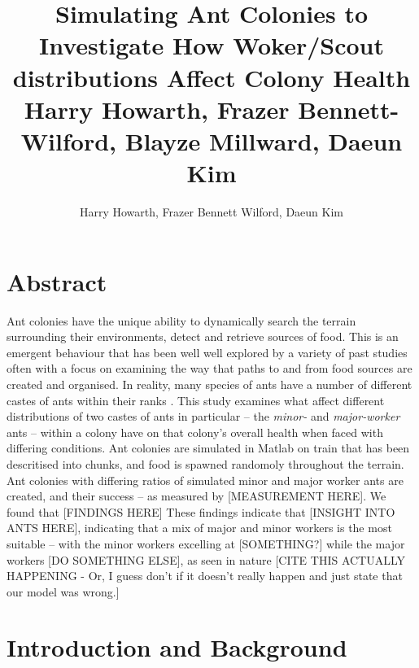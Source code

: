 \documentclass{article}
\title{
  Simulating Ant Colonies to Investigate How Woker/Scout distributions Affect Colony Health
  \small Harry Howarth, Frazer Bennett-Wilford, Blayze Millward, Daeun Kim \\
}
\author{Harry Howarth, Frazer Bennett Wilford, Daeun Kim}
\begin{document}
  
  \section*{Abstract}
    Ant colonies have the unique ability to dynamically search the terrain surrounding their environments, detect and retrieve sources of food. This is an emergent behaviour that
    has been well well explored by a variety of past studies \cite{camazine_self-organization_2003} %
    often with a focus on examining the way that paths to and from food sources are created and organised. %
    In reality, many species of ants have a number of different castes of ants within their ranks \cite{noauthor_caste_nodate}. This study examines what affect different distributions
    of two castes of ants in particular -- the \textit{minor-} and \textit{major-worker} ants -- within a colony have on that colony's overall health when faced with differing conditions.
    Ant colonies are simulated in Matlab on train that has been descritised into chunks, and food is spawned randomoly throughout the terrain. Ant colonies with differing ratios of simulated
    minor and major worker ants are created, and their success -- as measured by [MEASUREMENT HERE].%
    We found that [FINDINGS HERE]
    These findings indicate that [INSIGHT INTO ANTS HERE], indicating that a mix of major and minor workers is the most suitable -- with the minor workers excelling at [SOMETHING?] while the
    major workers [DO SOMETHING ELSE], as seen in nature [CITE THIS ACTUALLY HAPPENING - Or, I guess don't if it doesn't really happen and just state that our model was wrong.]

  \section{Introduction and Background}
		

\end{document}
